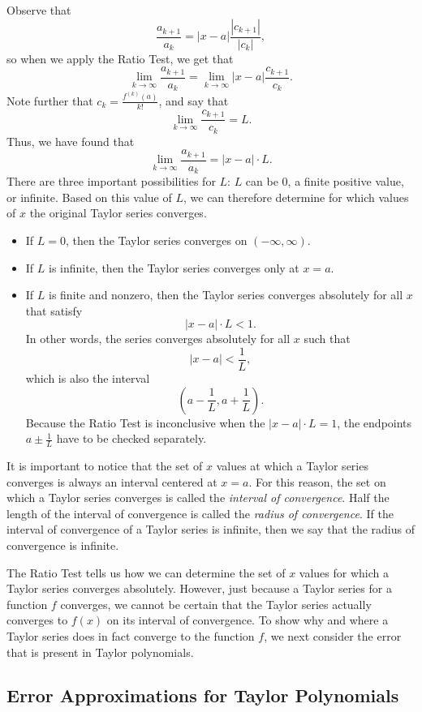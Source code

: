 Observe that
\[\frac{a_{k+1}}{{a_k}} = | x-a | \frac{| c_{k+1} |}{| c_{k} |},\]
so when we apply the Ratio Test, we get that
$$\lim_{k \to \infty} \frac{a_{k+1}}{a_k} = \lim_{k \to \infty} |x-a| \frac{c_{k+1}}{c_k}.$$
Note further that $c_k = \frac{f^{(k)}(a)}{k!}$, and say that $$\lim_{k \to \infty} \frac{c_{k+1}}{c_k} = L.$$
Thus, we have found that 
$$\lim_{k \to \infty} \frac{a_{k+1}}{a_k} = |x-a| \cdot L.$$
There are three important possibilities for $L$:  $L$ can be 0, a finite positive value, or infinite.  Based on this value of $L$, we can therefore determine for which values of $x$ the original Taylor series converges.
\begin{itemize}
\item If $L = 0$, then the Taylor series converges on $(-\infty, \infty)$.
\item If $L$ is infinite, then the Taylor series converges only at $x = a$.
\item If $L$ is finite and nonzero, then the Taylor series converges absolutely for all $x$ that satisfy
$$|x-a| \cdot L < 1.$$
In other words, the series converges absolutely for all $x$ such that 
$$|x-a| < \frac{1}{L},$$
which is also the interval
\[\left(a-\frac{1}{L}, a+\frac{1}{L}\right).\]
Because the Ratio Test is inconclusive when the $|x-a| \cdot L = 1$, the endpoints $a \pm \frac{1}{L}$ have to be checked separately.
\end{itemize}

It is important to notice that the set of $x$ values at which a Taylor series converges is always an interval centered at $x=a$. For this reason, the set on which a Taylor series converges is called the \emph{interval of convergence}. Half the length of the interval of convergence is called the \emph{radius of convergence}. If the interval of convergence of a Taylor series is infinite, then we say that the radius of convergence is infinite.



The Ratio Test tells us how we can determine the set of $x$ values for which a Taylor series converges absolutely. However, just because a Taylor series for a function $f$ converges, we cannot be certain that the Taylor series actually converges to $f(x)$ on its interval of convergence. To show why and where a Taylor series does in fact converge to the function $f$, we next consider the error that is present in Taylor polynomials.

\subsection*{Error Approximations for Taylor Polynomials} 

